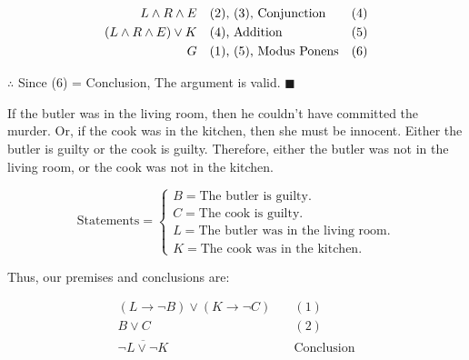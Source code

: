 \documentclass[]{article}
\begin{document}
\begin{align*}
    L \land R \land E \quad & \text{(2), (3), Conjunction} \hfill & \text{(4)} \\
    (L \land R \land E) \lor K \quad & \text{(4), Addition} \hfill & \text{(5)} \\
    G \quad & \text{(1), (5), Modus Ponens} \hfill & \text{(6)} \\
\end{align*}
\begin{center}
    $\therefore$ Since (6) = Conclusion, The argument is valid. $\blacksquare$
\end{center}

\begin{question}
    If the butler was in the living room, then he couldn’t have committed the murder. Or, if the cook was in the
kitchen, then she must be innocent. Either the butler is guilty or the cook is guilty. Therefore, either the butler
was not in the living room, or the cook was not in the kitchen.
\end{question}
\[  
    \text{Statements} = 
    \begin{cases}
        B = \text{The butler is guilty.} \\
        C = \text{The cook is guilty.} \\
        L = \text{The butler was in the living room.} \\
        K = \text{The cook was in the kitchen.}
    \end{cases}
\]
\begin{center}
    Thus, our premises and conclusions are:
\end{center}

\begin{align*}
    (L \rightarrow \neg B) \lor (K \rightarrow \neg C) & \quad (1) \\
    B \lor C & \quad (2) \\
    \overline{\neg L \lor \neg K} & \quad \text{Conclusion}
\end{align*}
\end{document}
